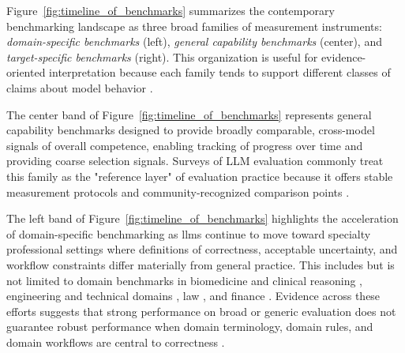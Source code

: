 Figure~\ref{fig:timeline_of_benchmarks} summarizes the contemporary benchmarking landscape as three broad families of measurement instruments: \emph{domain-specific benchmarks} (left), \emph{general capability benchmarks} (center), and \emph{target-specific benchmarks} (right). This organization is useful for evidence-oriented interpretation because each family tends to support different classes of claims about model behavior \cite{ni_SurveyLargeLanguageBenchmarks_2025}.

The center band of Figure~\ref{fig:timeline_of_benchmarks} represents general capability benchmarks designed to provide broadly comparable, cross-model signals of overall competence, enabling tracking of progress over time and providing coarse selection signals. Surveys of LLM evaluation commonly treat this family as the "reference layer" of evaluation practice because it offers stable measurement protocols and community-recognized comparison points \cite{chang_SurveyEvaluationLarge_2024, ni_SurveyLargeLanguageBenchmarks_2025}. 

The left band of Figure~\ref{fig:timeline_of_benchmarks} highlights the acceleration of domain-specific benchmarking as \acp{llm} continue to move toward specialty professional settings where definitions of correctness, acceptable uncertainty, and workflow constraints differ materially from general  practice. This includes but is not limited to domain benchmarks in biomedicine and clinical reasoning \cite{jin_PubMedQADatasetBiomedicalResearch_2019, Jin_Li_2024_Benchmarking_LLMs_EBM}, engineering and technical domains \cite{dorisDesignQAMultimodalBenchmark2024, syedBenchmarkingCapabilitiesLarge2024,
li_EEEBenchComprehensiveMultimodalElectrical_2025, zhouEngiBenchBenchmarkEvaluating2025, mudurFEABenchEvaluatingLanguage2025}, law \cite{fei_LawBenchBenchmarkingLegal_2023, guha_LegalBenchCollaborativelyBuilt_2023, chalkidis_LexGLUEBenchmarkDataset_2022}, and finance \cite{islam_FinanceBenchNewBenchmarkFinancial_2023}. Evidence across these efforts suggests that strong performance on broad or generic evaluation does not guarantee robust performance when domain terminology, domain rules, and domain workflows are central to correctness \cite{anjum_DomainSpecificBenchmarks_2025}.

